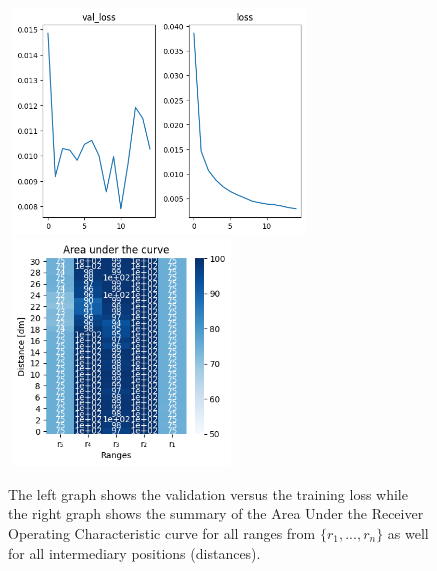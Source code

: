 \begin{figure}[h]%
\centering
\includegraphics[width=8cm,height=6cm]{3_models/models_2/graph_2.png} 
\hspace{0.2 cm}
\includegraphics[width=6cm,height=6cm]{4_plots/plots_2/AUC_2.png} 
\caption[]{The left graph shows the validation versus the training loss while the right graph shows the summary of the Area Under the Receiver Operating Characteristic curve for all ranges from $\{r_{1}, ... ,r_{n}\}$ as well for all intermediary positions (distances).}
\label{theta_alt}
\end{figure}

\newpage

